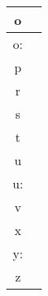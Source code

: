 \begin {longtable}{| c | c |}
    o  & \\ \hline 
    o:  & \\ \hline 
    p  & \\ \hline 
    r  & \\ \hline 
    s  & \\ \hline 
    t  & \\ \hline 
    u  & \\ \hline 
    u:  & \\ \hline
    v  & \\ \hline
    x  & \\ \hline 
    y:  & \\ \hline 
    z  & \\ \hline   

\end {longtable}

 